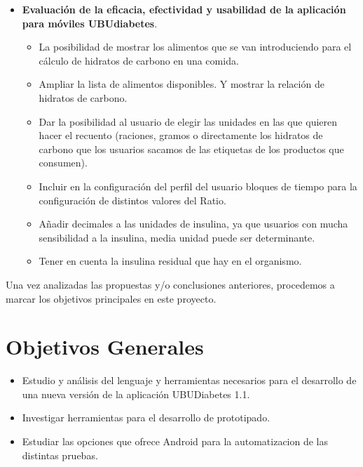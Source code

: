 \begin{itemize}
	\item \textbf{Evaluación de la eficacia, efectividad y usabilidad de la aplicación para móviles UBUdiabetes}\cite{bruno2017}.
	\begin{itemize}
		\item La posibilidad de mostrar los alimentos que se van introduciendo para el cálculo de hidratos de carbono en una comida.
		\item Ampliar la lista de alimentos disponibles. Y mostrar la relación de hidratos de carbono.
		\item Dar la posibilidad al usuario de elegir las unidades en las que quieren hacer el recuento (raciones, gramos o directamente los hidratos de carbono que los usuarios sacamos de las etiquetas de los productos que consumen).
		\item Incluir en la configuración del perfil del usuario bloques de tiempo para la configuración de distintos valores del Ratio.
		\item Añadir decimales a las unidades de insulina, ya que usuarios con mucha sensibilidad a la insulina, media unidad 	puede ser determinante.
		\item Tener en cuenta la insulina residual que hay en el organismo.
	\end{itemize}
\end{itemize}
Una vez analizadas las propuestas y/o conclusiones anteriores, procedemos a marcar los objetivos principales en este proyecto.
\section{ Objetivos Generales}
	\begin{itemize}
		\item Estudio y análisis del lenguaje y herramientas necesarios para el desarrollo de una nueva versión de la aplicación UBUDiabetes 1.1.
		\item Investigar herramientas para el desarrollo de prototipado.
		\item Estudiar las opciones que ofrece Android para la automatizacion de las distintas pruebas.
		
	\end{itemize}

